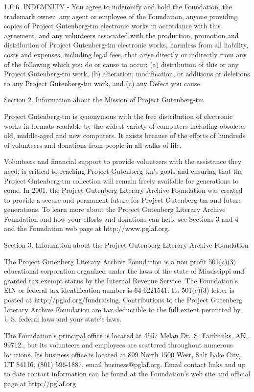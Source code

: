 \documentclass[12pt,oneside]{scrbook}
\begin{document}
  1.F.6. INDEMNITY - You agree to indemnify and hold the Foundation, the
  trademark owner, any agent or employee of the Foundation, anyone
  providing copies of Project Gutenberg-tm electronic works in accordance
  with this agreement, and any volunteers associated with the production,
  promotion and distribution of Project Gutenberg-tm electronic works,
  harmless from all liability, costs and expenses, including legal fees,
  that arise directly or indirectly from any of the following which you do
  or cause to occur: (a) distribution of this or any Project Gutenberg-tm
  work, (b) alteration, modification, or additions or deletions to any
  Project Gutenberg-tm work, and (c) any Defect you cause.
  
  Section 2. Information about the Mission of Project Gutenberg-tm
  
  Project Gutenberg-tm is synonymous with the free distribution of
  electronic works in formats readable by the widest variety of computers
  including obsolete, old, middle-aged and new computers. It exists
  because of the efforts of hundreds of volunteers and donations from
  people in all walks of life.
  
  Volunteers and financial support to provide volunteers with the
  assistance they need, is critical to reaching Project Gutenberg-tm's
  goals and ensuring that the Project Gutenberg-tm collection will remain
  freely available for generations to come. In 2001, the Project Gutenberg
  Literary Archive Foundation was created to provide a secure and
  permanent future for Project Gutenberg-tm and future generations. To
  learn more about the Project Gutenberg Literary Archive Foundation and
  how your efforts and donations can help, see Sections 3 and 4 and the
  Foundation web page at http://www.pglaf.org.
  
  Section 3. Information about the Project Gutenberg Literary Archive
  Foundation
  
  The Project Gutenberg Literary Archive Foundation is a non profit
  501(c)(3) educational corporation organized under the laws of the state
  of Mississippi and granted tax exempt status by the Internal Revenue
  Service. The Foundation's EIN or federal tax identification number is
  64-6221541. Its 501(c)(3) letter is posted at
  http://pglaf.org/fundraising. Contributions to the Project Gutenberg
  Literary Archive Foundation are tax deductible to the full extent
  permitted by U.S. federal laws and your state's laws.
  
  The Foundation's principal office is located at 4557 Melan Dr.~S.
  Fairbanks, AK, 99712., but its volunteers and employees are scattered
  throughout numerous locations. Its business office is located at 809
  North 1500 West, Salt Lake City, UT 84116, (801) 596-1887, email
  business@pglaf.org. Email contact links and up to date contact
  information can be found at the Foundation's web site and official page
  at http://pglaf.org
  
\end{document}
